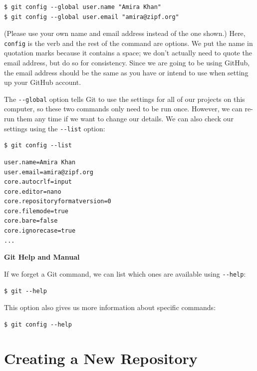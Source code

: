 \documentclass[
]{krantz}
\renewenvironment{quote}{\begin{VF}}{\end{VF}}
\begin{document}
\begin{verbatim}
$ git config --global user.name "Amira Khan"
$ git config --global user.email "amira@zipf.org"
\end{verbatim}

(Please use your own name and email address instead of the one shown.)
Here,
\texttt{config} is the verb
and the rest of the command are options.
We put the name in quotation marks because it contains a space;
we don't actually need to quote the email address,
but do so for consistency.
Since we are going to be using GitHub,
the email address should be the same as you have or intend to use
when setting up your GitHub account.

The \texttt{-\/-global} option tells Git to use the settings for all of our projects on this computer,
so these two commands only need to be run once.
However,
we can re-run them any time if we want to change our details.
We can also check our settings using the \texttt{-\/-list} option:

\begin{verbatim}
$ git config --list
\end{verbatim}

\begin{verbatim}
user.name=Amira Khan
user.email=amira@zipf.org
core.autocrlf=input
core.editor=nano
core.repositoryformatversion=0
core.filemode=true
core.bare=false
core.ignorecase=true
...
\end{verbatim}

\begin{quote}
\textbf{Git Help and Manual}

If we forget a Git command,
we can list which ones are available using \texttt{-\/-help}:

\begin{verbatim}
$ git --help
\end{verbatim}

This option also gives us more information about specific commands:

\begin{verbatim}
$ git config --help
\end{verbatim}
\end{quote}

\hypertarget{git-cmdline-repos}{%
\section{Creating a New Repository}\label{git-cmdline-repos}}
\end{document}
